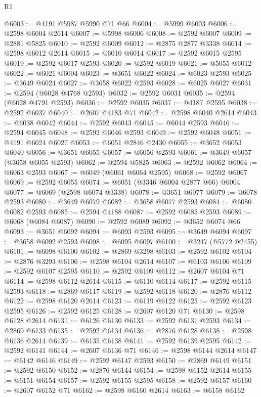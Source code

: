 \begin{lexlean}{R1}
\begin{coremodule}
@6003 := @4191 @5987 @5990 @71 @66
@6004 := @5999 @6003
@6006 := @2598 @6004 @2614
@6007 := @5998 @6006
@6008 := @2592 @6007
@6009 := @2881 @5825
@6010 := @2592 @6009
@6012 := @2875 @2877 @3338
@6014 := @2598 @6012 @2614
@6015 := @6010 @6014
@6017 := @2592 @6015 @2595
@6019 := @2592 @6017 @2593
@6020 := @2592 @6019
@6021 := @5055 @6012
@6022 := @6021 @6004
@6023 := @3651 @6022
@6024 := @6023 @2593
@6025 := @3649 @6024
@6027 := @3658 @6022 @2593
@6028 := @6025 @6027
@6031 := @2594 (@6028 @4768 @2593)
@6032 := @2592 @6031
@6035 := @2594 (@6028 @4791 @2593)
@6036 := @2592 @6035
@6037 := @4187 @2595
@6038 := @2592 @6037
@6040 := @2607 @4183 @71
@6042 := @2598 @6040 @2614
@6043 := @6038 @6042
@6044 := @2592 @6043
@6045 := @6044 @2593
@6046 := @2594 @6045
@6048 := @2592 @6046 @2593
@6049 := @2592 @6048
@6051 := @4191 @6024 @6027
@6053 := @6051 @2846 @2430
@6055 := @3652 @6053 @6040
@6056 := @3651 @6055
@6057 := @6056 @2593
@6061 := @3649 @6057 (@3658 @6055 @2593)
@6062 := @2594 @5825
@6063 := @2592 @6062
@6064 := @6063 @2593
@6067 := @6049 (@6061 @6064 @2595)
@6068 := @2592 @6067
@6069 := @2592 @6055
@6074 := @6051 (@3346 @6004 @2877 @66) @6004
@6077 := @6069 (@2598 @6074 @3338)
@6078 := @3651 @6077
@6079 := @6078 @2593
@6080 := @3649 @6079
@6082 := @3658 @6077 @2593
@6084 := @6080 @6082 @2593
@6085 := @2594 @4188
@6087 := @2592 @6085 @2593
@6089 := @6068 (@6084 @6087)
@6090 := @2592 @6089
@6092 := @3652 @6074 @66
@6093 := @3651 @6092
@6094 := @6093 @2593
@6095 := @3649 @6094
@6097 := @3658 @6092 @2593
@6098 := @6095 @6097
@6100 := @3247 (@5772 @2455)
@6101 := @6098 @6100
@6102 := @2869 @3298
@6103 := @2592 @6102
@6104 := @2876 @3293
@6106 := @2598 @6104 @2614
@6107 := @6103 @6106
@6109 := @2592 @6107 @2595
@6110 := @2592 @6109
@6112 := @2607 @6104 @71
@6114 := @2598 @6112 @2614
@6115 := @6110 @6114
@6117 := @2592 @6115 @2593
@6118 := @2869 @6117
@6119 := @2592 @6118
@6120 := @2876 @6112
@6122 := @2598 @6120 @2614
@6123 := @6119 @6122
@6125 := @2592 @6123 @2595
@6126 := @2592 @6125
@6128 := @2607 @6120 @71
@6130 := @2598 @6128 @2614
@6131 := @6126 @6130
@6133 := @2592 @6131 @2593
@6134 := @2869 @6133
@6135 := @2592 @6134
@6136 := @2876 @6128
@6138 := @2598 @6136 @2614
@6139 := @6135 @6138
@6141 := @2592 @6139 @2595
@6142 := @2592 @6141
@6144 := @2607 @6136 @71
@6146 := @2598 @6144 @2614
@6147 := @6142 @6146
@6149 := @2592 @6147 @2593
@6150 := @2869 @6149
@6151 := @2592 @6150
@6152 := @2876 @6144
@6154 := @2598 @6152 @2614
@6155 := @6151 @6154
@6157 := @2592 @6155 @2595
@6158 := @2592 @6157
@6160 := @2607 @6152 @71
@6162 := @2598 @6160 @2614
@6163 := @6158 @6162

\end{coremodule}
\end{lexlean}
